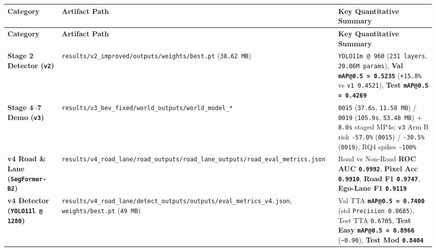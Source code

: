 \documentclass[10.5pt,a4paper]{article}
\begin{document}
\begin{footnotesize}
\setlength{\tabcolsep}{4pt}
\setlength{\LTleft}{0pt}\setlength{\LTright}{0pt}
\begin{longtable}{>{\raggedright\arraybackslash}p{} >{\raggedright\arraybackslash}p{} >{\raggedright\arraybackslash}p{}}
\toprule
\textbf{Category} & \textbf{Artifact Path} & \textbf{Key Quantitative Summary} \\
\midrule
\endfirsthead
\toprule
\textbf{Category} & \textbf{Artifact Path} & \textbf{Key Quantitative Summary} \\
\midrule
\endhead
\bottomrule
\endfoot
\textbf{Stage 2 Detector (\texttt{v2})} & \texttt{results/\allowbreak{}v2\_\allowbreak{}improved/\allowbreak{}outputs/\allowbreak{}weights/\allowbreak{}best.\allowbreak{}pt} (\texttt{38.\allowbreak{}62 MB}) & \texttt{YOLO11m @ 960} (\texttt{231 layers}, \texttt{20.\allowbreak{}06M params}), \textbf{Val \texttt{mAP@0.\allowbreak{}5 = 0.\allowbreak{}5235}} (\texttt{+15.\allowbreak{}8\%} vs \texttt{v1 0.\allowbreak{}4521}), \textbf{Test \texttt{mAP@0.\allowbreak{}5 = 0.\allowbreak{}4269}} \\
\textbf{Stage 4--7 Demo (\texttt{v3})} & \texttt{results/\allowbreak{}v3\_\allowbreak{}bev\_\allowbreak{}fixed/\allowbreak{}world\_\allowbreak{}outputs/\allowbreak{}world\_\allowbreak{}model\_\allowbreak{}*} & \texttt{0015} (\texttt{37.\allowbreak{}6s}, \texttt{11.\allowbreak{}58 MB}) / \texttt{0019} (\texttt{105.\allowbreak{}9s}, \texttt{53.\allowbreak{}48 MB}) + \texttt{8.\allowbreak{}0s} staged MP4s; \texttt{v3} Arm B risk \texttt{-\allowbreak{}57.\allowbreak{}0\%} (\texttt{0015}) / \texttt{-\allowbreak{}30.\allowbreak{}5\%} (\texttt{0019}), RQ4 spikes \texttt{-\allowbreak{}100\%} \\
\textbf{v4 Road \& Lane (\texttt{SegFormer-\allowbreak{}B2})} & \texttt{results/\allowbreak{}v4\_\allowbreak{}road\_\allowbreak{}lane/\allowbreak{}road\_\allowbreak{}outputs/\allowbreak{}road\_\allowbreak{}lane\_\allowbreak{}outputs/\allowbreak{}road\_\allowbreak{}eval\_\allowbreak{}metrics.\allowbreak{}json} & Road vs Non-Road \textbf{ROC AUC \texttt{0.\allowbreak{}9992}}, \textbf{Pixel Acc \texttt{0.\allowbreak{}9910}}, \textbf{Road F1 \texttt{0.\allowbreak{}9747}}, \textbf{Ego-Lane F1 \texttt{0.\allowbreak{}9119}} \\
\textbf{v4 Detector (\texttt{YOLO11l @ 1280})} & \texttt{results/\allowbreak{}v4\_\allowbreak{}road\_\allowbreak{}lane/\allowbreak{}detect\_\allowbreak{}outputs/\allowbreak{}outputs/\allowbreak{}eval\_\allowbreak{}metrics\_\allowbreak{}v4.\allowbreak{}json}, \texttt{weights/\allowbreak{}best.\allowbreak{}pt} (\texttt{49 MB}) & Val TTA \textbf{\texttt{mAP@0.\allowbreak{}5 = 0.\allowbreak{}7400}} (std \texttt{Precision 0.\allowbreak{}8685}), Test TTA \texttt{0.\allowbreak{}6705}, \textbf{Test Easy \texttt{mAP@0.\allowbreak{}5 = 0.\allowbreak{}8966}} (\texttt{\textasciitilde{}0.\allowbreak{}90}), \textbf{Test Mod \texttt{0.\allowbreak{}8404}} \\

\end{longtable}
\end{footnotesize}
\end{document}
